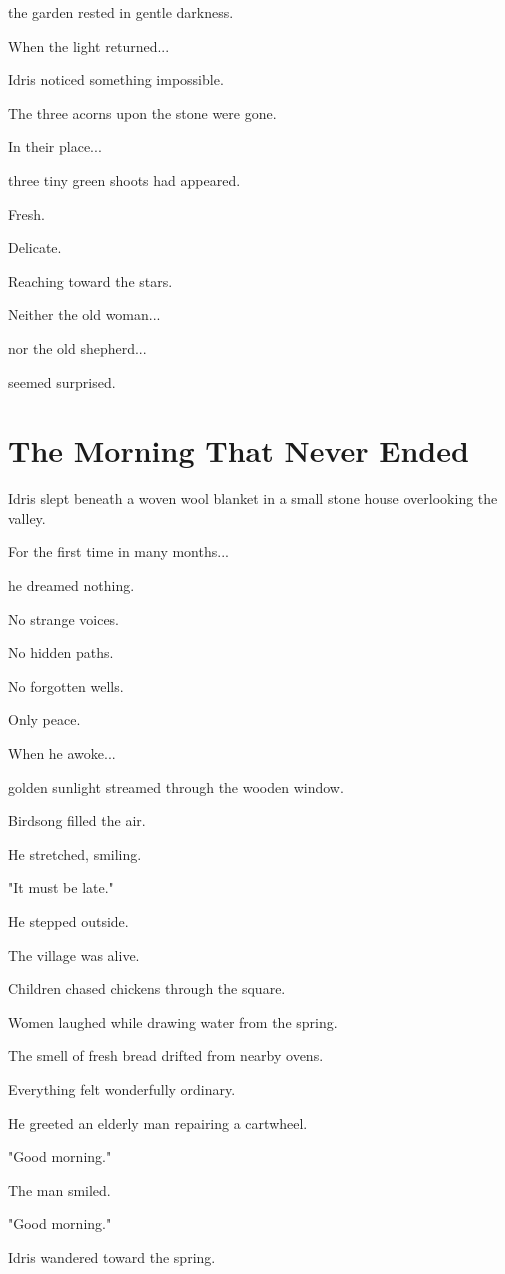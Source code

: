 \documentclass[12pt,openany]{book}
\begin{document}
the garden rested in gentle darkness.

When the light returned...

Idris noticed something impossible.

The three acorns upon the stone were gone.

In their place...

three tiny green shoots had appeared.

Fresh.

Delicate.

Reaching toward the stars.

Neither the old woman...

nor the old shepherd...

seemed surprised.
\section*{The Morning That Never Ended}

Idris slept beneath a woven wool blanket in a small stone house overlooking the valley.

For the first time in many months...

he dreamed nothing.

No strange voices.

No hidden paths.

No forgotten wells.

Only peace.

When he awoke...

golden sunlight streamed through the wooden window.

Birdsong filled the air.

He stretched, smiling.

"It must be late."

He stepped outside.

The village was alive.

Children chased chickens through the square.

Women laughed while drawing water from the spring.

The smell of fresh bread drifted from nearby ovens.

Everything felt wonderfully ordinary.

He greeted an elderly man repairing a cartwheel.

"Good morning."

The man smiled.

"Good morning."

Idris wandered toward the spring.
\end{document}
